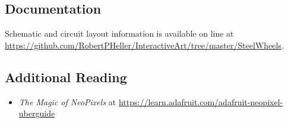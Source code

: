 \subsection*{Documentation}

Schematic and circuit layout information is available on line at 
\url{https://github.com/RobertPHeller/InteractiveArt/tree/master/SteelWheels}.

\subsection*{Additional Reading}

\begin{itemize}
\item \textit{The Magic of NeoPixels} at 
\url{https://learn.adafruit.com/adafruit-neopixel-uberguide} 
\end{itemize}
